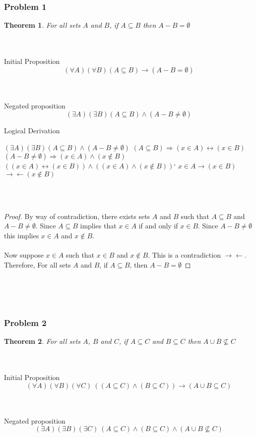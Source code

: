 \documentclass[12pt]{article}
\newtheorem{theorem}{Theorem}[section]
\newcommand{\contradiction}{$\rightarrow\leftarrow$}
\newcommand{\symbolicexample}[3]{
    \begin{theorem}
        #1
    \end{theorem}

    \\\\
    Initial Proposition
    \begin{equation}
        #2
    \end{equation}

    \\\\
    Negated proposition
    \begin{equation}
        #3
    \end{equation}
}
\begin{document}
                \subsubsection{Problem 1}
                \symbolicexample{For all sets $A$ and $B$, if $A\subseteq B$ then $A-B=\emptyset$}
                {(\forall A)(\forall B)(A\subseteq B)\rightarrow (A-B=\emptyset)}
                {(\exists A)(\exists B)(A\subseteq B)\wedge (A-B\ne\emptyset)}

                Logical Derivation
                \begin{outline}
                    \1 $(\exists A)(\exists B)(A\subseteq B)\wedge (A-B\ne\emptyset)$
                        \2 $(A\subseteq B) \Rightarrow (x\in A)\leftrightarrow(x\in B)$
                        \2 $(A-B\ne\emptyset)\Rightarrow (x\in A)\wedge (x\notin B)$
                    \1 $((x\in A)\leftrightarrow(x\in B)) \wedge ((x\in A)\wedge (x\notin B))$`
                    \1 $x\in A \rightarrow (x\in B)$ \contradiction $(x\notin B)$
                \end{outline}
                \\\\
                \begin{proof}
                    By way of contradiction, there exists sets $A$ and $B$ such that $A\subseteq B$ and $A-B\ne \emptyset$.
                    Since $A\subseteq B$ implies that $x\in A$ if and only if $x\in B$.
                    Since $A-B\ne \emptyset$ this implies $x\in A$ and $x\notin B$.
                    \\\\
                    Now suppose $x\in A$ such that $x\in B$ and $x\notin B$.
                    This is a contradiction \contradiction.
                    Therefore, For all sets $A$ and $B$, if $A\subseteq B$, then $A-B=\emptyset$
                \end{proof}
                \\\\\\

                \subsubsection{Problem 2}
                \symbolicexample{For all sets $A$, $B$ and $C$, if $A\subseteq C$ and $B\subseteq C$ then $A\cup B \not\subseteq C$}
                {(\forall A)(\forall B)(\forall C)\ ((A\subseteq C)\wedge (B\subseteq C))\rightarrow (A\cup B \subseteq C)}
                {(\exists A)(\exists B)(\exists C)\ (A\subseteq C)\wedge (B\subseteq C)\wedge (A\cup B \not\subseteq C)}
\end{document}
